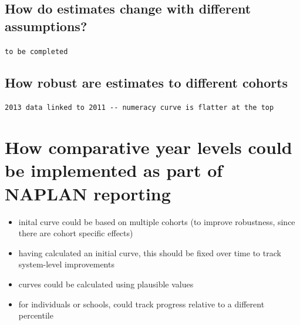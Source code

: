 \subsection{How do estimates change with different assumptions?}

\verb+to be completed+

\subsection{How robust are estimates to different cohorts}

\verb+2013 data linked to 2011 -- numeracy curve is flatter at the top+

\section{How comparative year levels could be implemented as part of NAPLAN reporting}

\begin{itemize}
    \item inital curve could be based on multiple cohorts (to improve robustness, since there are cohort specific effects)
    \item having calculated an initial curve, this should be fixed over time to track system-level improvements
    \item curves could be calculated using plausible values
    \item for individuals or schools, could track progress relative to a different percentile 
\end{itemize}












